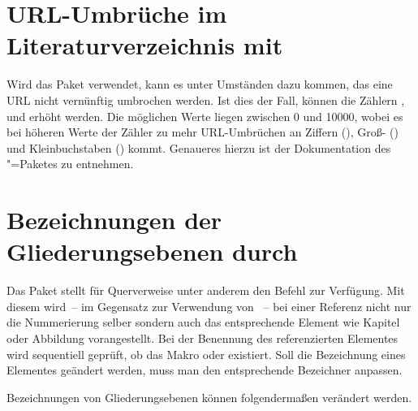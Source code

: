 \section{URL-Umbrüche im Literaturverzeichnis mit }
Wird das Paket  verwendet, kann es unter Umständen dazu 
kommen, das eine URL nicht vernünftig umbrochen werden. Ist dies der Fall, 
können die Zählern ,  und 
 erhöht werden. Die möglichen Werte liegen zwischen 0 
und 10000, wobei es bei höheren Werte der Zähler zu mehr URL-Umbrüchen an 
Ziffern (), Groß- () und 
Kleinbuchstaben () kommt. Genaueres hierzu ist der 
Dokumentation des "=Paketes zu entnehmen.



\section{Bezeichnungen der Gliederungsebenen durch }
Das Paket  stellt für Querverweise unter anderem den Befehl 
 zur Verfügung. Mit diesem wird~-- im 
Gegensatz zur Verwendung von ~-- bei einer Referenz nicht nur die 
Nummerierung selber sondern auch das entsprechende Element wie Kapitel oder 
Abbildung vorangestellt. Bei der Benennung des referenzierten Elementes wird 
sequentiell geprüft, ob das Makro \Macro*{}
oder \Macro*{} existiert. Soll die Bezeichnung 
eines Elementes geändert werden, muss man den entsprechende Bezeichner anpassen.
%
\begin{Example}
Bezeichnungen von Gliederungsebenen können folgendermaßen verändert werden.
\begin{Code}
\end{Code}
\end{Example}



